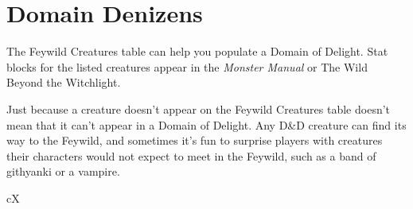 \documentclass[10pt,a4paper,twoside,bg=print,twocolumn,openany,nodeprecatedcode]{dndbook}
\begin{document}
\section{Domain Denizens}
The Feywild Creatures table can help you populate a Domain of Delight. Stat blocks for the listed creatures appear in the \textit{Monster Manual} or The Wild Beyond the Witchlight.

Just because a creature doesn't appear on the Feywild Creatures table doesn't mean that it can't appear in a Domain of Delight. Any D\&D creature can find its way to the Feywild, and sometimes it's fun to surprise players with creatures their characters would not expect to meet in the Feywild, such as a band of githyanki or a vampire.

\begin{DndTable}[header=Feywild Creatures]{cX}


\end{DndTable}
\end{document}
